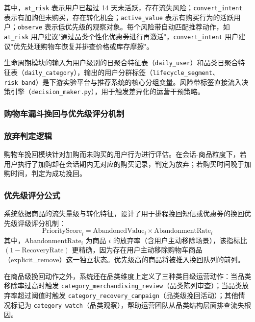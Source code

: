 其中，\texttt{at\_risk} 表示用户已超过 14 天未活跃，存在流失风险；\texttt{convert\_intent} 表示有加购但未购买，存在转化机会；\texttt{active\_value} 表示有购买行为的活跃用户；\texttt{observe} 表示低优先级的观察对象。每个风险带自动匹配推荐动作，如 \texttt{at\_risk} 用户建议"通过品类个性化优惠券进行再激活"，\texttt{convert\_intent} 用户建议"优先处理购物车恢复并排查价格或库存摩擦"。

生命周期模块的输入为用户级别的日聚合特征表（\texttt{daily\_user}）和品类日聚合特征表（\texttt{daily\_category}），输出的用户分群标签（\texttt{lifecycle\_segment}、\texttt{risk\_band}）是下游实验平台与推荐系统的核心分组变量。风险带标签直接流入决策引擎（\texttt{decision\_maker.py}），用于触发差异化的运营干预策略。

\subsubsection{购物车漏斗挽回与优先级评分机制}

\subsubsection{放弃判定逻辑}

购物车挽回模块针对加购而未购买的用户行为进行评估。在会话-商品粒度下，若用户执行了加购却在会话期内无对应的购买记录，判定为放弃；若购买时间晚于加购时间，判定为成功挽回。

\subsubsection{优先级评分公式}

系统依据商品的流失量级与转化特征，设计了用于排程挽回短信或优惠券的挽回优先级评级评分机制：
\begin{equation}
    \text{PriorityScore}_i = \text{AbandonedValue}_i \times \text{AbandonmentRate}_i
\end{equation}
其中，$\text{AbandonmentRate}_i$ 为商品 $i$ 的放弃率（含用户主动移除场景），该指标比 $(1-\text{RecoveryRate})$ 更精确，因为存在用户主动移除购物车商品（explicit\_remove）这一独立状态。优先级高的商品将被推入挽回队列的前列。

在商品级挽回动作之外，系统还在品类维度上定义了三种类目级运营动作：当品类移除率过高时触发 \texttt{category\_merchandising\_review}（品类陈列审查）；当品类放弃率超过阈值时触发 \texttt{category\_recovery\_campaign}（品类级挽回活动）；其他情况标记为 \texttt{category\_watch}（品类观察），帮助运营团队从品类结构层面排查流失根因。

